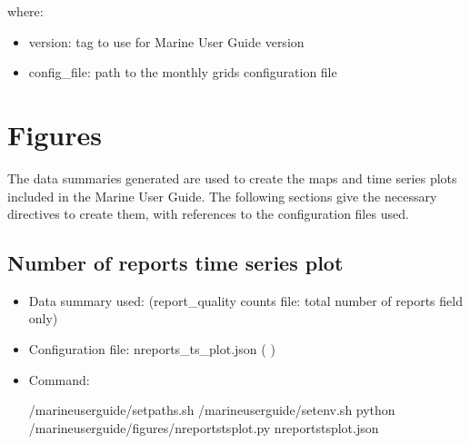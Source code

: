 \documentclass[letterpaper,10pt,english]{sphinxmanual}
\begin{document}
where:
\begin{itemize}
\item {} 
version: tag to use for Marine User Guide version

\item {} 
config\_file: path to the monthly grids configuration file

\end{itemize}


\section{Figures}
\label{\detokenize{index:figures}}
The data summaries generated are used to create the maps and time series plots
included in the Marine User Guide. The following sections give the necessary
directives to create them, with references to the configuration files used.


\subsection{Number of reports time series plot}
\label{\detokenize{index:number-of-reports-time-series-plot}}\begin{itemize}
\item {} 
Data summary used: {\hyperref[\detokenize{index:qi-counts-um-section}]{}} (report\_quality counts file: total number of reports field only)

\item {} 
Configuration file: nreports\_ts\_plot.json ( {\hyperref[\detokenize{index:nreports-ts-config}]{}})

\item {} 
Command:

\begin{sphinxVerbatim}[commandchars=\\\{\}]
 /marine\PYGZhy{}user\PYGZhy{}guide/setpaths.sh
 /marine\PYGZhy{}user\PYGZhy{}guide/setenv.sh
python /marine\PYGZhy{}user\PYGZhy{}guide/figures/nreports\PYGZus{}ts\PYGZus{}plot.py nreports\PYGZus{}ts\PYGZus{}plot.json
\end{sphinxVerbatim}

\end{itemize}
\end{document}
